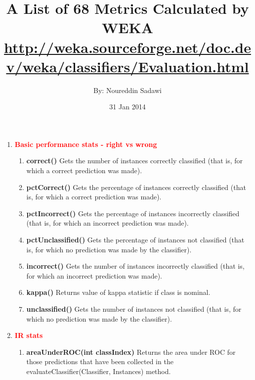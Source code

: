 \documentclass[a4paper,12pt, english]{article}
\begin{document}
\title{A List of 68 Metrics Calculated by WEKA \\ \small{\url{http://weka.sourceforge.net/doc.dev/weka/classifiers/Evaluation.html}}}
\date{31 Jan 2014}
\author{By: Noureddin Sadawi}
\maketitle

\large

\begin{enumerate}

\item \textbf{\textcolor{red}{Basic performance stats - right vs wrong}}
\begin{enumerate}
              
\item \textbf{correct()}
          Gets the number of instances correctly classified (that is, for which a correct prediction was made).
          
\item \textbf{pctCorrect()}
          Gets the percentage of instances correctly classified (that is, for which a correct prediction was made). 

\item \textbf{pctIncorrect()}
          Gets the percentage of instances incorrectly classified (that is, for which an incorrect prediction was made).

\item \textbf{pctUnclassified()}
          Gets the percentage of instances not classified (that is, for which no prediction was made by the classifier). 

\item \textbf{incorrect()}
          Gets the number of instances incorrectly classified (that is, for which an incorrect prediction was made). 
          
\item \textbf{kappa()}
          Returns value of kappa statistic if class is nominal. 
          
\item \textbf{unclassified()}
          Gets the number of instances not classified (that is, for which no prediction was made by the classifier).
\end{enumerate}    

\item  \textbf{\textcolor{red}{IR stats}}
\begin{enumerate}          
\item \textbf{areaUnderROC(int classIndex)}
          Returns the area under ROC for those predictions that have been collected in the evaluateClassifier(Classifier, Instances) method. 
          

\end{enumerate}
\end{enumerate}
\end{document}
